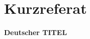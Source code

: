 \documentclass[./\jobname.tex]{subfiles}
\begin{document}
\setcounter{page}{2}
\chapter*{Kurzreferat}
\subsubsection*{Deutscher TITEL}
\blindtext[3]
\end{document}
